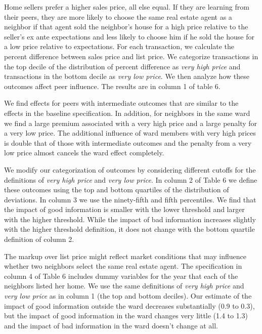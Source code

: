\documentclass[12pt]{article}
\begin{document}
    Home sellers prefer a higher sales price, all else equal. If they are
    learning from their peers, they are more likely to choose the same real estate agent as a neighbor if that agent sold the neighbor's house for a
    high price relative to the seller's ex ante expectations and less likely to choose him if he sold the house for a low price relative to expectations.
    For each transaction, we calculate the percent difference between sales price and list price. We categorize transactions in the top decile of the
    distribution of percent difference as \emph{very high price} and transactions in the bottom decile as \emph{very low price}. We then analyze how these outcomes affect peer influence. The results are in
    column 1 of table 6.

    We find effects for peers with intermediate outcomes that are similar to the effects in the baseline specification. In
    addition, for neighbors in the same ward we find a large premium associated with a very high price and a large penalty for a very low price. The
    additional influence of ward members with very high prices is double that of those with intermediate outcomes and the penalty from a very low
    price almost cancels the ward effect completely.

We modify our categorization of outcomes by considering different
cutoffs for the definitions of \emph{very high price} and \emph{very low
price}. In column 2 of Table 6 we define these outcomes using the top
and bottom quartiles of the distribution of deviations. In column 3 we
use the ninety-fifth and fifth percentiles. We find that the impact of
good information is smaller with the lower threshold and larger with
the higher threshold. While the impact of bad information increases
slightly with the higher threshold definition, it does not change with
the bottom quartile definition of column 2.

The markup over list price might reflect market conditions that
may influence whether two neighbors select the same real estate
agent. The specification in column 4 of Table 6 includes dummy
variables for the year that each of the neighbors listed her home. We
use the same definitions of \emph{very high price} and  \emph{very low price}
as in column 1 (the top and bottom deciles). Our estimate of the
impact of good information outside the ward decreases substantially
(0.9 to 0.3), but the impact of good information in the ward changes
very little (1.4 to 1.3) and the impact of bad information in the ward
doesn't change at all.
\end{document}
